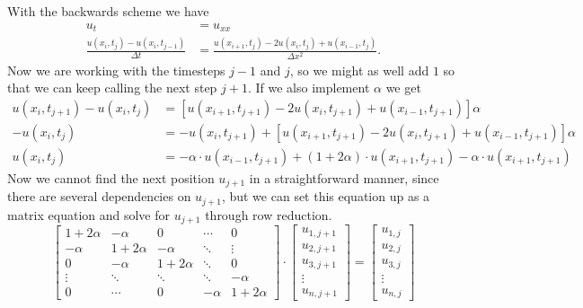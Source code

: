 With the backwards scheme we have
\begin{align*}
    u_t &= u_{xx} \\
    \frac{u(x_i, t_j) - u(x_i, t_{j-1})}{\Delta t}
    &= \frac{u(x_{i+1}, t_j) - 2u(x_i, t_j) + u(x_{i-1}, t_j)}{\Delta x^2}.
\end{align*}
Now we are working with the timesteps $j-1$ and $j$, so we might as well add 
$1$ so that we can keep calling the next step $j+1$. If we also implement 
$\alpha$ we get
\begin{align*}
    u(x_i, t_{j+1}) - u(x_i, t_j)
    &= \left[
       u(x_{i+1}, t_{j+1}) - 2u(x_i, t_{j+1}) + u(x_{i-1}, t_{j+1}) 
       \right] \alpha \\       
    - u(x_i, t_j)
    &= - u(x_i, t_{j+1})
       + \left[ u(x_{i+1}, t_{j+1}) - 2u(x_i, t_{j+1}) + u(x_{i-1}, t_{j+1}) 
        \right] \alpha \\   
    u(x_i, t_j)
    &=         - \alpha \cdot u(x_{i-1}, t_{j+1})
       + (1 + 2 \alpha) \cdot u(x_{i+1}, t_{j+1})   
               - \alpha \cdot u(x_{i+1}, t_{j+1})
\end{align*}
Now we cannot find the next position $u_{j+1}$ in a straightforward manner, 
since there are several dependencies on $u_{j+1}$, but we can set this equation 
up as a matrix equation and solve for $u_{j+1}$ through row reduction.
$$
\begin{bmatrix}
    1+2\alpha &   -\alpha &         0 &    \cdots &         0 \\
      -\alpha & 1+2\alpha &   -\alpha &    \ddots &    \vdots \\
            0 &   -\alpha & 1+2\alpha &    \ddots &         0 \\
       \vdots &    \ddots &    \ddots &    \ddots &   -\alpha \\
            0 &    \cdots &         0 &   -\alpha & 1+2\alpha
\end{bmatrix}
\cdot
\begin{bmatrix}
    u_{1,j+1} \\ u_{2,j+1} \\ u_{3,j+1} \\ \vdots \\ u_{n,j+1}
\end{bmatrix}
=
\begin{bmatrix}
    u_{1,j} \\ u_{2,j} \\ u_{3,j} \\ \vdots \\ u_{n,j}
\end{bmatrix}
$$
